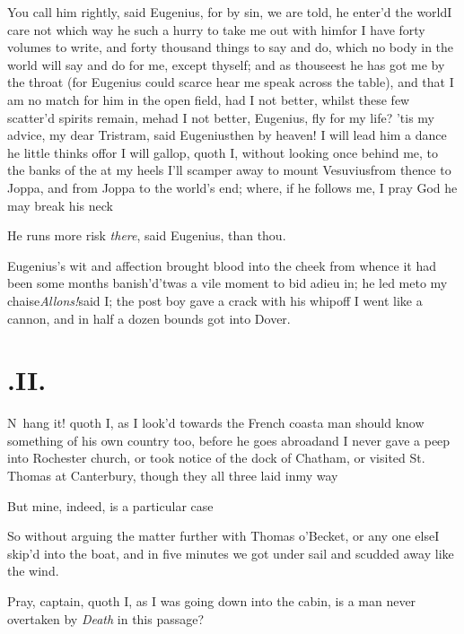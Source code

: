 \documentclass{article}
\begin{document}
\tsk You call him rightly, said Eugenius,\break
\tsk for by sin, we are told, he enter’d the world\tsh I care not which way he
 such a hurry to take me out with him\tsk for
I have forty volumes to write, and forty thousand things to say and do, which no body
in the world will say and do for me, except thyself; and as thou\pb seest he has got
me by the throat (for Eugenius could scarce hear me speak across the table), and
that I am no match for him in the open field, had I not better, 
whilst these few scatter’d spirits remain, 
me\tsk had I not better, Eugenius, fly for my life? ’tis my
advice, my dear Tristram, said Eugenius\tsk then by heaven! I
will lead him a dance he little thinks of\tsh for I will gallop,
quoth I, without looking once behind me, to the banks of the
 at my heels\tsh
I’ll scamper away to mount Vesuvius\tsh from thence to Jop\-pa,
and from Joppa to the world’s end; where, if he follows me, I
pray God he may break his neck\tsh

\newpage
\tsh He runs more risk \textit{there}, said Eugenius,
than thou.

Eugenius’s wit and affection brought blood into the
cheek from whence it had been some months
banish’d\tsh ’twas a vile moment to bid adieu
in; he led me\break to my chaise\tsh \textit{Allons!}\@ said I; the
post boy gave a crack with his whip\tsh off I went like a
cannon, and in half a dozen bounds got into Dover.

\newpage
\section{.\enspace II.}

\lettrine{N}{\,} hang it! quoth I, as I look’d towards the French coast\tsk a man should
know something of his own\break
country too, before he goes abroad\tsh and I never gave a
peep into Rochester church, or took notice of the dock of Chatham, or visited St.\@
Thomas at Canterbury, though they all three laid in\break my way\tsh

\tsk But mine, indeed, is a particular case\tsh

So without arguing the matter further with Thomas o’Becket, or any one else\tsk I
skip’d into the boat, and in five minutes we got under sail and scudded away like
the wind.

\newpage
Pray, captain, quoth I, as I was going down into the cabin, is a man never overtaken
by \textit{Death} in this passage?
\end{document}
